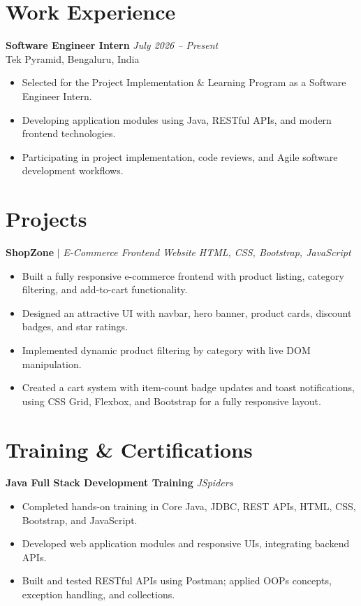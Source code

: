 \documentclass[11pt,a4paper]{article}
\begin{document}
\section{Work Experience}
\textbf{Software Engineer Intern} \hfill \textit{July 2026 -- Present} \\
Tek Pyramid, Bengaluru, India
\begin{itemize}[leftmargin=*, itemsep=1pt, parsep=0pt, topsep=2pt]
    \item Selected for the Project Implementation \& Learning Program as a Software Engineer Intern.
    \item Developing application modules using Java, RESTful APIs, and modern frontend technologies.
    \item Participating in project implementation, code reviews, and Agile software development workflows.
\end{itemize}

\section{Projects}
\textbf{ShopZone} $|$ \textit{E-Commerce Frontend Website} \hfill \textit{HTML, CSS, Bootstrap, JavaScript}
\begin{itemize}[leftmargin=*, itemsep=1pt, parsep=0pt, topsep=2pt]
    \item Built a fully responsive e-commerce frontend with product listing, category filtering, and add-to-cart functionality.
    \item Designed an attractive UI with navbar, hero banner, product cards, discount badges, and star ratings.
    \item Implemented dynamic product filtering by category with live DOM manipulation.
    \item Created a cart system with item-count badge updates and toast notifications, using CSS Grid, Flexbox, and Bootstrap for a fully responsive layout.
\end{itemize}

\section{Training \& Certifications}
\textbf{Java Full Stack Development Training} \hfill \textit{JSpiders}
\begin{itemize}[leftmargin=*, itemsep=1pt, parsep=0pt, topsep=2pt]
    \item Completed hands-on training in Core Java, JDBC, REST APIs, HTML, CSS, Bootstrap, and JavaScript.
    \item Developed web application modules and responsive UIs, integrating backend APIs.
    \item Built and tested RESTful APIs using Postman; applied OOPs concepts, exception handling, and collections.
\end{itemize}
\end{document}
